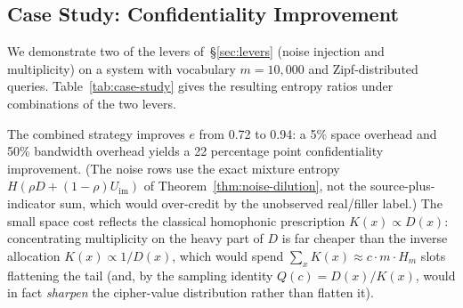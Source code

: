 \documentclass[conference]{IEEEtran}
\theoremstyle{definition}
\theoremstyle{plain}
\theoremstyle{remark}
\begin{document}
\subsection{Case Study: Confidentiality Improvement}

We demonstrate two of the levers of~\S\ref{sec:levers} (noise
injection and multiplicity) on a system with vocabulary
$m = 10{,}000$ and Zipf-distributed queries.  Table~\ref{tab:case-study}
gives the resulting entropy ratios under combinations of the two
levers.

\begin{table}[ht]
\centering
\caption{Confidentiality improvement via two of the levers of
\S\ref{sec:levers} (noise injection and multiplicity).  Values are
analytical, computed from the Zipf
entropy, the mixture-entropy formula in Theorem~\ref{thm:noise-dilution},
and the homophonic construction in Example~\ref{ex:homophonic}.}
\label{tab:case-study}
\end{table}

The combined strategy improves $e$ from 0.72 to 0.94: a 5\% space
overhead and 50\% bandwidth overhead yields a 22 percentage point
confidentiality improvement.  (The noise rows use the exact mixture
entropy $H(\rho D + (1-\rho)U_{\mathrm{im}})$ of
Theorem~\ref{thm:noise-dilution}, not the source-plus-indicator sum,
which would over-credit by the unobserved real/filler label.)  The small
space cost reflects the
classical homophonic prescription $K(x) \propto D(x)$: concentrating
multiplicity on the heavy part of $D$ is far cheaper than the inverse
allocation $K(x) \propto 1/D(x)$, which would spend
$\sum_x K(x) \approx c \cdot m \cdot H_m$ slots flattening the tail
(and, by the sampling identity $Q(c) = D(x)/K(x)$, would in fact
\emph{sharpen} the cipher-value distribution rather than flatten it).
\end{document}
